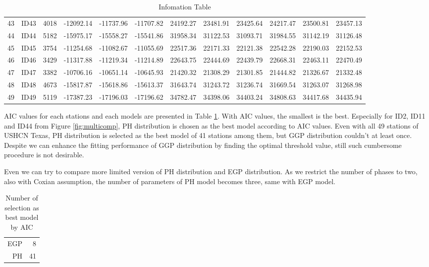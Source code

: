 \documentclass[12pt]{article}\usepackage[]{graphicx}\usepackage[]{color}
\begin{document}
\begin{table}[ht]
{\begin{tabular}{rlrrrrrrrrrr}
  43 & ID43 & 4018 & -12092.14 & -11737.96 & -11707.82 & 24192.27 & 23481.91 & 23425.64 & 24217.47 & 23500.81 & 23457.13 \\ 
  44 & ID44 & 5182 & -15975.17 & -15558.27 & -15541.86 & 31958.34 & 31122.53 & 31093.71 & 31984.55 & 31142.19 & 31126.48 \\ 
  45 & ID45 & 3754 & -11254.68 & -11082.67 & -11055.69 & 22517.36 & 22171.33 & 22121.38 & 22542.28 & 22190.03 & 22152.53 \\ 
  46 & ID46 & 3429 & -11317.88 & -11219.34 & -11214.89 & 22643.75 & 22444.69 & 22439.79 & 22668.31 & 22463.11 & 22470.49 \\ 
  47 & ID47 & 3382 & -10706.16 & -10651.14 & -10645.93 & 21420.32 & 21308.29 & 21301.85 & 21444.82 & 21326.67 & 21332.48 \\ 
  48 & ID48 & 4673 & -15817.87 & -15618.86 & -15613.37 & 31643.74 & 31243.72 & 31236.74 & 31669.54 & 31263.07 & 31268.98 \\ 
  49 & ID49 & 5119 & -17387.23 & -17196.03 & -17196.62 & 34782.47 & 34398.06 & 34403.24 & 34808.63 & 34417.68 & 34435.94 \\ 
   \bottomrule
\end{tabular}
}
\caption{Infomation Table} 
\label{tab:aic}
\end{table}



AIC values for each stations and each models are presented in Table \ref{tab:aic}. With AIC values, the smallest is the best. Especially for ID2, ID11 and ID44 from Figure \ref{fig:multicomp}, PH distribution is chosen as the best model according to AIC values. Even with all 49 stations of USHCN Texas, PH distribution is selected as the best model of 41 stations among them, but GGP distribution couldn't at least once. Despite we can enhance the fitting performance of GGP distribution by finding the optimal threshold value, still such cumbersome procedure is not desirable. 

Even we can try to compare more limited version of PH distribution and EGP distribution. As we restrict the number of phases to two, also with Coxian assumption, the number of parameters of PH model becomes three, same with EGP model. 

\begin{table}[ht]
\centering
\begin{tabular}{rr}
  \toprule
  \midrule
EGP &   8 \\ 
  PH &  41 \\ 
   \bottomrule
\end{tabular}
\caption{Number of selection as best model by AIC} 
\label{tab:bestaic}
\end{table}
\end{document}
